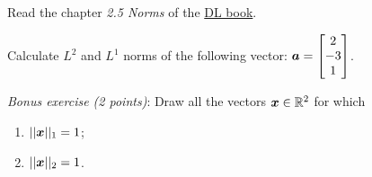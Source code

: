 \begin{exercise}

Read the chapter \textit{2.5 Norms} of the \href{https://www.deeplearningbook.org/contents/linear_algebra.html}{DL book}. 

Calculate $L^2$ and $L^1$ norms of the following vector: $\boldsymbol{a} = \begin{bmatrix} 2 \\ -3 \\ 1 \end{bmatrix}$.

\vspace{3em}

\textit{Bonus exercise (2 points)}: Draw all the vectors $\boldsymbol{x} \in \mathbb{R}^2$ for which 
\begin{enumerate}
    \item $||\boldsymbol{x}||_1 = 1$;
    \item $||\boldsymbol{x}||_2 = 1$.
\end{enumerate}

\end{exercise}

